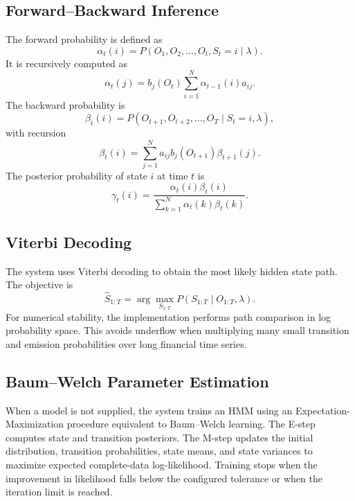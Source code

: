 \documentclass[conference]{IEEEtran}
\begin{document}
\subsection{Forward--Backward Inference}
The forward probability is defined as
\begin{equation}
    \alpha_t(i)=P(O_1,O_2,\ldots,O_t,S_t=i \mid \lambda).
\end{equation}
It is recursively computed as
\begin{equation}
    \alpha_t(j)=b_j(O_t)\sum_{i=1}^{N}\alpha_{t-1}(i)a_{ij}.
\end{equation}
The backward probability is
\begin{equation}
    \beta_t(i)=P(O_{t+1},O_{t+2},\ldots,O_T \mid S_t=i,\lambda),
\end{equation}
with recursion
\begin{equation}
    \beta_t(i)=\sum_{j=1}^{N}a_{ij}b_j(O_{t+1})\beta_{t+1}(j).
\end{equation}
The posterior probability of state $i$ at time $t$ is
\begin{equation}
    \gamma_t(i)=
    \frac{\alpha_t(i)\beta_t(i)}
    {\sum_{k=1}^{N}\alpha_t(k)\beta_t(k)}.
\end{equation}

\subsection{Viterbi Decoding}
The system uses Viterbi decoding to obtain the most likely hidden state path. The objective is
\begin{equation}
    \hat{S}_{1:T} =
    \arg\max_{S_{1:T}} P(S_{1:T} \mid O_{1:T}, \lambda).
\end{equation}
For numerical stability, the implementation performs path comparison in log probability space. This avoids underflow when multiplying many small transition and emission probabilities over long financial time series.

\subsection{Baum--Welch Parameter Estimation}
When a model is not supplied, the system trains an HMM using an Expectation-Maximization procedure equivalent to Baum--Welch learning. The E-step computes state and transition posteriors. The M-step updates the initial distribution, transition probabilities, state means, and state variances to maximize expected complete-data log-likelihood. Training stops when the improvement in likelihood falls below the configured tolerance or when the iteration limit is reached.
\end{document}
